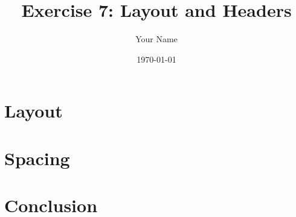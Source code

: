 \documentclass{article}
\title{Exercise 7: Layout and Headers}
\author{Your Name}
\date{\today}
\begin{document}
\maketitle

\section{Layout}

\section{Spacing}

\section{Conclusion}
\end{document}
